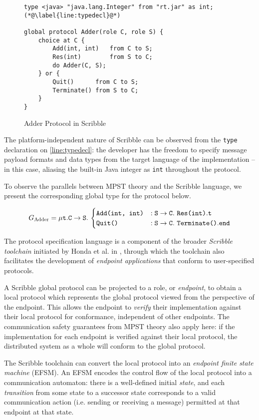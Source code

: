 \begin{figure}[!ht]
\begin{lstlisting}[language=Scribble]
type <java> "java.lang.Integer" from "rt.jar" as int; (*@\label{line:typedecl}@*)

global protocol Adder(role C, role S) {
	choice at C {
		Add(int, int)	from C to S;
		Res(int)		from S to C;
		do Adder(C, S);
	} or {
		Quit()		from C to S;
		Terminate()	from S to C;	
	}
}
\end{lstlisting}
\caption{Adder Protocol in Scribble}
\label{fig:adder}
\end{figure}

The platform-independent nature of Scribble 
can be observed from the \texttt{type} declaration 
on \cref{line:typedecl}: 
the developer has the freedom to specify message payload formats 
and data types from the target language of the implementation 
-- in this case, aliasing the built-in Java integer as 
\texttt{int} throughout the protocol.

To observe the parallels between MPST theory
and the Scribble language,
we present the corresponding global type for
the  protocol below.

\[
G_\text{Adder} = \mu\textnormal{\texttt{t}}.{
{\mathtt{C}} \to {\mathtt{S}}. ~ {
	\begin{cases}
		\texttt{Add(int, int)} & :
			{\mathtt{S}} \to {\mathtt{C}}. ~ {\texttt{Res(int)}}. \textnormal{\texttt{t}} \\
		\texttt{Quit()} & : 
			{\mathtt{S}} \to {\mathtt{C}}. ~ {\texttt{Terminate()}}. \textnormal{\texttt{end}} \\		
	\end{cases}
}} 
\]

The protocol specification language is 
a component of the broader 
\textit{Scribble toolchain} initiated by 
Honda et al. in \cite{Scribble}, 
through which the toolchain also facilitates 
the development of 
\textit{endpoint applications} that 
conform to user-specified protocols.

A Scribble global protocol can be projected
to a role, or \textit{endpoint},
to obtain a local protocol which represents
the global protocol viewed from the perspective
of the endpoint.
This allows the endpoint to \textit{verify} their
implementation against their local protocol
for conformance, independent of other endpoints.
The communication safety guarantees from MPST
theory also apply here: if the implementation
for each endpoint is verified against their
local protocol, the distributed system as
a whole will conform to the global protocol.

The Scribble toolchain can convert the local
protocol into an \textit{endpoint finite state machine}
(EFSM).
An EFSM encodes the control flow of the local
protocol into a communication automaton:
there is a well-defined initial \textit{state},
and each \textit{transition} from some state to a
successor state corresponds to a valid communication
action (i.e. sending or receiving a message) permitted
at that endpoint at that state.


